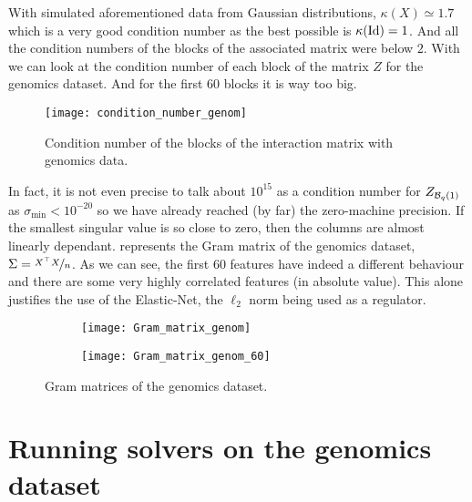 \documentclass[../main.tex]{subfiles}
\begin{document}
With simulated aforementioned data from Gaussian distributions, $\kappa(X)\simeq 1.7$ which is
a very good condition number as the best possible is $\kappa(\operatorname{Id})=1$.
And all the condition numbers of the blocks of the associated matrix were below $2$.
With  we can look at the condition number of each block of
the matrix $Z$ for the genomics dataset. And for the first $60$ blocks it is way too big.
\begin{figure}[ht]
    \centering
    \texttt{[image: condition\_number\_genom]}
    \caption{Condition number of the blocks of the interaction matrix with genomics data.}
    \label{fig:cond_genom}
\end{figure}

\medskip

In fact, it is not even precise to talk about $10^{15}$ as a condition number
for $Z_{\mathcal{B}_{q}(1)}$ as $\sigma_{\min} < 10^{-20}$ so we have already reached
(by far) the zero-machine precision.
If the smallest singular value is so close to zero, then the columns are almost
linearly dependant.
  represents the Gram matrix of the genomics dataset,
 $\Sigma=\nicefrac{X^\top X}{n}$.
As we can see, the first $60$ features have indeed a different behaviour and
there are some very highly correlated features (in absolute value).
This alone justifies the use of the Elastic-Net, the $\ell_2$ norm being
used as a regulator.
\begin{figure}[ht]
    \centering
	\begin{subfigure}{.45\textwidth}
		\centering
		\texttt{[image: Gram\_matrix\_genom]}
	\end{subfigure} \hspace{.1cm}
	\begin{subfigure}{.45\textwidth}
		\centering
		\texttt{[image: Gram\_matrix\_genom\_60]}
	\end{subfigure}
	\caption{Gram matrices of the genomics dataset.}
    \label{fig:gram_genom}
\end{figure}

\section{Running solvers on the genomics dataset} \label{sec:solv_genom}
\end{document}
